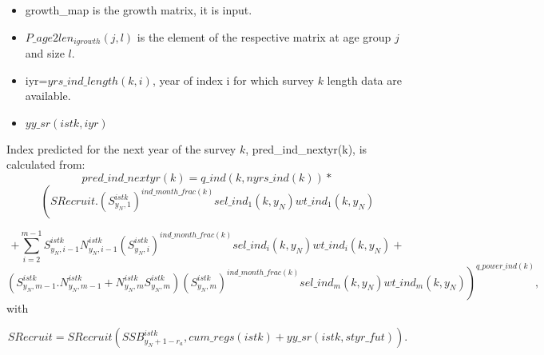 \documentclass{article}
\begin{document}
\begin{itemize}

    \item growth\_map is the growth matrix, it is input. %
    \item $P\_age2len_{igrowth}(j,l)$ is the element of the respective matrix at age group $j$ and size $l$.
    \item iyr=$yrs\_ind\_length(k,i)$, year of index i for which survey $k$ length data are available.
    
    \item $yy\_sr(istk,iyr)$ 
    \end{itemize}
    
Index predicted for the next year of the survey $k$, pred\_ind\_nextyr(k), is calculated from:
\begin{equation}
    pred\_ind\_nextyr(k)=q\_ind(k,nyrs\_ind(k)) * 
\end{equation}
\begin{equation*}
    \left( SRecruit. {\left(S^{istk}_{y_N,1}\right)}^{ind\_month\_frac(k)} sel\_ind_1(k,y_N)  wt\_ind_1(k,y_N)\right.
\end{equation*}


\begin{equation}
+\sum_{i=2}^{m-1}S^{istk}_{y_N,i-1}N^{istk}_{y_N,i-1}{\left(S^{istk}_{y_N,i}\right)}^{ind\_month\_frac(k)} sel\_ind_i(k,y_N)  wt\_ind_i(k,y_N)+
\end{equation}
\begin{equation*}
  \left. (S^{istk}_{y_N,m-1}.N^{istk}_{y_N,m-1}+N^{istk}_{y_N,m}S^{istk}_{y_N,m}){\left(S^{istk}_{y_N,m}\right)}^{ind\_month\_frac(k)} sel\_ind_m(k,y_N)  wt\_ind_m(k,y_N) \right)^{q\_power\_ind(k)},
\end{equation*}
with

\begin{equation}
    SRecruit=SRecruit(SSB^{istk}_{y_N+1-r_a},cum\_regs(istk)+yy\_sr(istk,styr\_fut)).
\end{equation}
\end{document}
